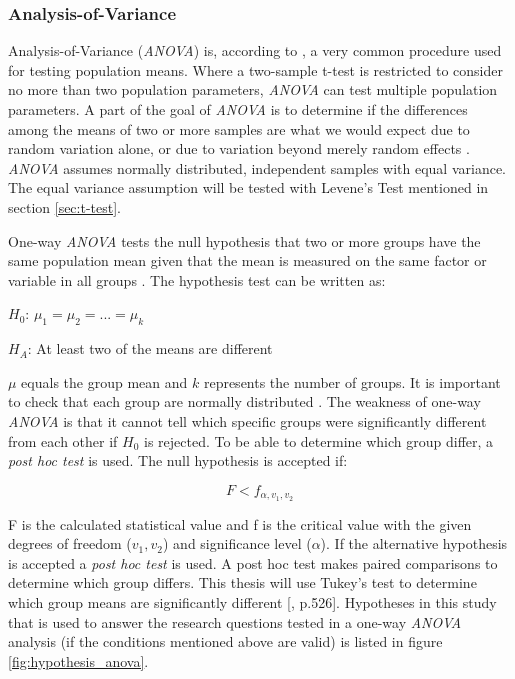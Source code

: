 \subsubsection[ANOVA]{Analysis-of-Variance}\label{sec:anova}
Analysis-of-Variance (\textit{ANOVA}) is, according to \cite{Walpole2012}, a very common procedure used for testing population means. Where a two-sample t-test is restricted to consider no more than two population parameters, \textit{ANOVA} can test multiple population parameters. A part of the goal of \textit{ANOVA} is to determine if the differences among the means of two or more samples are what we would expect due to random variation alone, or due to variation beyond merely random effects \citep{Walpole2012}. \textit{ANOVA} assumes normally distributed, independent samples with equal variance. The equal variance assumption will be tested with Levene's Test mentioned in section \ref{sec:t-test}. 

One-way \textit{ANOVA} tests the null hypothesis that two or more groups have the same population mean given that the mean is measured on the same factor or variable in all groups \citep{LundResearchLtd2013a}. The hypothesis test can be written as:\newline

\centerline{$H_{0}$:  $\mu_{1} =  \mu_{2} = ... = \mu_{k} $} 
\centerline{$H_{A}$:  At least two of the means are different}

$\mu$ equals the group mean and $k$ represents the number of groups. It is important to check that each group are normally distributed \citep{LundResearchLtd2013a}. The weakness of one-way \textit{ANOVA} is that it cannot tell which specific groups were significantly different from each other if $H_{0}$ is rejected. To be able to determine which group differ, a \textit{post hoc test} is used. The null hypothesis is accepted if:

\begin{equation}
\label{eq:anova_reject}
F < f_{\alpha, v_{1}, v_{2}}
\end{equation}

F is the calculated statistical value and f is the critical value with the given degrees of freedom ($v_{1}, v_{2}$) and significance level ($\alpha$). If the alternative hypothesis is accepted a \textit{post hoc test} is used. A post hoc test makes paired comparisons to determine which group differs. This thesis will use Tukey's test to determine which group means are significantly different [\citep{Walpole2012}, p.526]. Hypotheses in this study that is used to answer the research questions tested in a one-way \textit{ANOVA} analysis (if the conditions mentioned above are valid) is listed in figure \ref{fig:hypothesis_anova}. 

